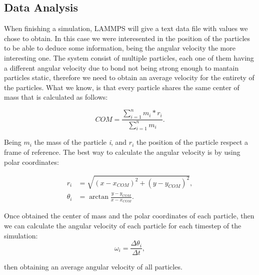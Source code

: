 \subsection{Data Analysis}

When finishing a simulation, LAMMPS will give a text data file with values we chose to obtain. In this case we were interesented in the position of the particles to be able to deduce some information, being the angular velocity the more interesting one. The system consist of multiple particles, each one of them having a different angular velocity due to bond not being strong enough to mantain particles static, therefore we need to obtain an average velocity for the entirety of the particles. What we know, is that every particle shares the same center of mass that is calculated as follows:

\begin{equation}
  COM = \displaystyle\frac{\sum^{n}_{i=1} m_i * r_i}{\sum^{n}_{i=1} m_i}.
  \label{eq:centerofmass}
\end{equation}

Being $m_i$ the mass of the particle \textit{i}, and $r_i$ the position of the particle respect a frame of reference. The best way to calculate the angular velocity is by using polar coordinates:

\begin{align}
  r_i & = \sqrt{(x - x_{COM})^2 + (y - y_{COM})^2},\\ 
  \theta _i &= \arctan{\frac{y - y_{COM}}{x - x_{COM}}}.
\end{align}

Once obtained the center of mass and the polar coordinates of each particle, then we can calculate the angular velocity of each particle for each timestep of the simulation:
\begin{equation}
  \omega _i = \frac{\Delta \theta _i}{\Delta t},
  \label{eq:angularvelocity}
\end{equation}

then obtaining an average angular velocity of all particles.

